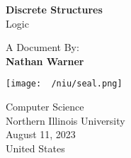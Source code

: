 \documentclass{report}
\title{\Huge{}}
\author{\huge{Nathan Warner}}
\date{\huge{}}
\begin{document}
        \begin{titlepage}
       \begin{center}
           \vspace*{1cm}
    
           \textbf{Discrete Structures} \\
           Logic
    
           \vspace{0.5cm}
            
                
           \vspace{1.5cm}
    
           A Document By: \\
           \textbf{Nathan Warner}
    
           \vfill
                
                
           \vspace{0.8cm}
         
           \texttt{[image: ~/niu/seal.png]}
                
           Computer Science \\
           Northern Illinois University\\
           August 11, 2023 \\
           United States\\
           
                
       \end{center}
    \end{titlepage}
    \tableofcontents
    \pagebreak \bigbreak \noindent
\end{document}
